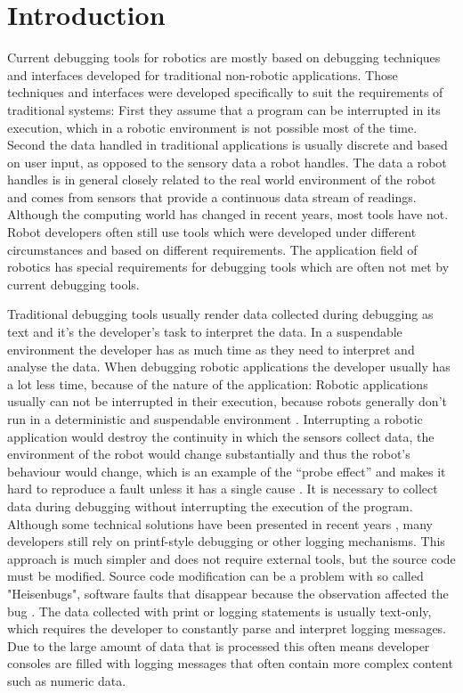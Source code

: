 \chapter{Introduction}

Current debugging tools for robotics are mostly based on debugging techniques and interfaces developed for traditional non-robotic applications. Those techniques and interfaces were developed specifically to suit the requirements of traditional systems: First they assume that a program can be interrupted in its execution, which in a robotic environment is not possible most of the time. Second the data handled in traditional applications is usually discrete and based on user input, as opposed to the sensory data a robot handles. The data a robot handles is in general closely related to the real world environment of the robot and comes from sensors that provide a continuous data stream of readings. Although the computing world has changed in recent years, most tools have not. Robot developers often still use tools which were developed under different circumstances and based on different requirements. The application field of robotics has special requirements for debugging tools which are often not met by current debugging tools.

Traditional debugging tools usually render data collected during debugging as text and it's the developer's task to interpret the data. In a suspendable environment the developer has as much time as they need to interpret and analyse the data. When debugging robotic applications the developer usually has a lot less time, because of the nature of the application: Robotic applications usually can not be interrupted in their execution, because robots generally don't run in a deterministic and suspendable environment \cite{Gumbley2009}. Interrupting a robotic application would destroy the continuity in which the sensors collect data, the environment of the robot would change substantially and thus the robot's behaviour would change, which is an example of the ``probe effect'' and makes it hard to reproduce a fault unless it has a single cause \cite{Gumbley2009}. It is necessary to collect data during debugging without interrupting the execution of the program. Although some technical solutions have been presented in recent years \cite{Gumbley2009}, many developers still rely on printf-style debugging or other logging mechanisms. This approach is much simpler and does not require external tools, but the source code must be modified. Source code modification can be a problem with so called "Heisenbugs", software faults that disappear because the observation affected the bug \cite{Grottke2005}. The data collected with print or logging statements is usually text-only, which requires the developer to constantly parse and interpret logging messages. Due to the large amount of data that is processed this often means developer consoles are filled with logging messages that often contain more complex content such as numeric data.

